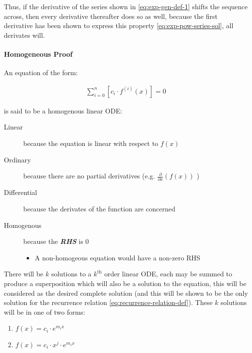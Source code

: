 \documentclass[11pt]{article}
\begin{document}
Thus, if the derivative of the series shown in \eqref{eq:exp-gen-def-1} shifts the
sequence across, then every derivative thereafter does so as well, because the
first derivative has been shown to express this property
\eqref{eq:exp-pow-series-sol}, all derivates will.

\paragraph{Homogeneous Proof}
\label{sec:org624ab51}
An equation of the form:

\begin{align}
\sum^{n}_{i=0} \left[ c_{i} \cdot f^{(i)}(x) \right] = 0 \label{eq:hom-ode}
\end{align}

is said to be a homogenous linear ODE: \cite[Ch. 2]{zillDifferentialEquations2009a}

\begin{description}
\item[{Linear}] because the equation is linear with respect to \(f(x)\)
\item[{Ordinary}] because there are no partial derivatives (e.g. \(\frac{\partial }{\partial x}{\left({ f{\left({ x }\right)} }\right)}\)  )
\item[{Differential}] because the derivates of the function are concerned
\item[{Homogenous}] because the \textbf{\emph{RHS}} is 0
\begin{itemize}
\item A non-homogeous equation would have a non-zero RHS
\end{itemize}
\end{description}

There will be \(k\) solutions to a \(k^{\mathrm{th}}\) order linear ODE, each may be summed to produce a superposition which will also be a solution to the equation, \cite[Ch. 4]{zillDifferentialEquations2009a}  this will be considered as the desired complete solution (and this will be shown to be the only solution for the recurrence relation \eqref{eq:recurrence-relation-def}). These \(k\) solutions will be in one of two forms:

\begin{enumerate}
\item \(f(x)=c_{i} \cdot e^{m_{i}x}\)
\item \(f(x)=c_{i} \cdot x^{j}\cdot e^{m_{i}x}\)
\end{enumerate}
\end{document}
